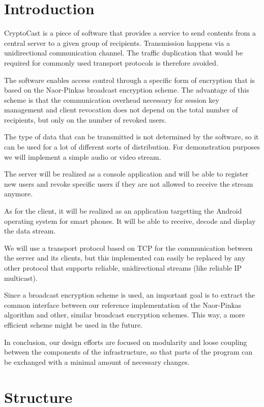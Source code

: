 \documentclass[a4paper,10pt]{scrartcl}
\title{\doctitle}
\author{\authorName}
\date{\today}
\begin{document}

\tableofcontents
\clearpage

\section{Introduction}
CryptoCast is a piece of software that provides a service to send contents from a central server to a given
group of recipients. Transmission happens via a unidirectional communication channel.
The traffic duplication that would be required for commonly used transport protocols is therefore avoided.

The software enables access control through a specific form of encryption that is based on the Naor-Pinkas broadcast
encryption scheme. The advantage of this scheme is that the communication overhead necessary for session key
management and client revocation does not depend on the total number of recipients, but only on the
number of revoked users.

The type of data that can be transmitted is not determined by the software, so it can be used for a lot
of different sorts of distribution. For demonstration purposes we will implement a simple audio or video
stream.

The server will be realized as a console application and will be able to register new users and revoke
specific users if they are not allowed to receive the stream anymore.

As for the client, it will be realized as an application targetting the Android operating system for smart phones.
It will be able to receive, decode and display the data stream.

We will use a transport protocol based on TCP for the communication between the server and its clients,
but this implemented can easily be replaced by any other protocol that supports reliable, unidirectional
streams (like reliable IP multicast).

Since a broadcast encryption scheme is used, an important goal is to extract the common interface between our
reference implementation of the Naor-Pinkas algorithm and other, similar broadcast encryption schemes.
This way, a more efficient scheme might be used in the future.

In conclusion, our design efforts are focused on modularity and loose coupling between the components of the
infrastructure, so that parts of the program can be exchanged with a minimal amount of necessary changes.

\section{Structure}
\end{document}
